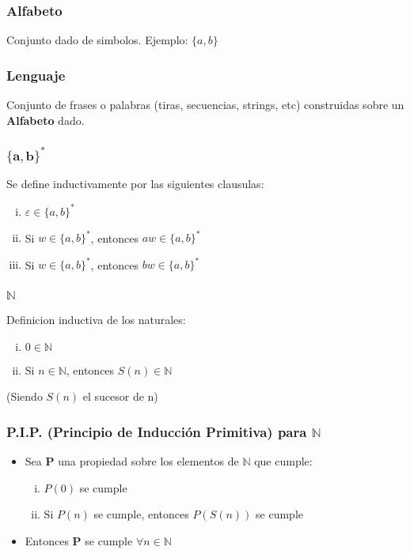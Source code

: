 \documentclass[article,12pt]{report}
\newcommand{\bd}[1]{\mathbf{#1}}
\newcommand{\NN}{\mathbb{N}}
\begin{document}
\subsubsection*{Alfabeto}
Conjunto dado de simbolos. Ejemplo: $\{a, b\}$
\subsubsection*{Lenguaje}
Conjunto de frases o palabras (tiras, secuencias, strings, etc) construidas sobre un \textbf{Alfabeto} dado.
\subsubsection*{$\bd{\{a, b\}^*}$}
Se define inductivamente por las siguientes clausulas:
\begin{enumerate}[i.]
  \item $\varepsilon \in \{a,b\}^*$
  \item Si $w \in \{a,b\}^*$, entonces $aw \in \{a,b\}^*$
  \item Si $w \in \{a,b\}^*$, entonces $bw \in \{a,b\}^*$
\end{enumerate}

\subsubsection*{$\NN$}
Definicion inductiva de los naturales:
\begin{enumerate}[i.]
  \item $0 \in \NN$
  \item Si $n \in \NN$, entonces $S(n) \in \NN$
\end{enumerate}
(Siendo $S(n)$ el sucesor de n)

\subsubsection*{P.I.P. (Principio de Inducción Primitiva) para $\NN$}
\begin{itemize}
  \item Sea $ \bd{P} $ una propiedad sobre los elementos de $\NN$ que cumple:
  \begin{enumerate}[i.]
    \item $P(0)$ se cumple
    \item Si $P(n)$ se cumple, entonces $P(S(n))$ se cumple
  \end{enumerate}
  \item Entonces $\bd{P}$ se cumple $\forall n \in \NN$
\end{itemize}
\end{document}
